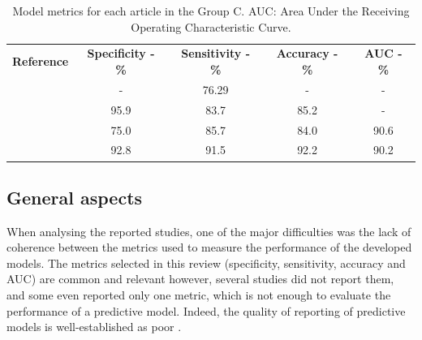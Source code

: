 \documentclass[11pt]{article}
\begin{document}
\begin{table}[]
    \centering
    \begin{tabular}{ccccc}\toprule
        \multirow{2}{*}{\textbf{Reference}} & \multirow{2}{*}{\textbf{Specificity - \%}} & \multirow{2}{*}{\textbf{Sensitivity - \%}} & \multirow{2}{*}{\textbf{Accuracy - \%}} & \multirow{2}{*}{\textbf{AUC - \%}} \\
        \\\midrule
        \cite{Bi2017}                       & -                                          & 76.29                                      & -                                       & -                                  \\
        \cite{Bi2022}                       & 95.9                                       & 83.7                                       & 85.2                                    & -                                  \\
        \cite{Kong2022}                     & 75.0                                       & 85.7                                       & 84.0                                    & 90.6                               \\
        \cite{Zheng2020}                    & 92.8                                       & 91.5                                       & 92.2                                    & 90.2                               \\
        \bottomrule
    \end{tabular}
    \caption{Model metrics for each article in the Group C. AUC: Area Under the Receiving Operating Characteristic Curve.}
    \label{tab:res_C}
\end{table}

\subsection{General aspects}

When analysing the reported studies, one of the major difficulties was the lack
of coherence between the metrics used to measure the performance of the
developed models. The metrics selected in this review (specificity, sensitivity,
accuracy and AUC) are common and relevant
however, several studies did not report them, and some even reported only one
metric, which is not enough to evaluate the performance of a predictive model.
Indeed, the quality of reporting of predictive models is well-established as
poor \cite{Zhang2022}.
\end{document}

